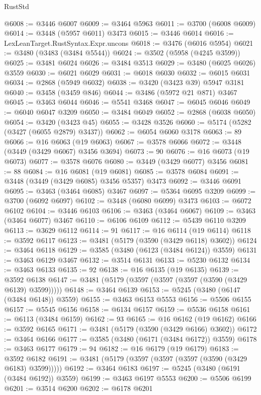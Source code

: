\begin{lexlean}{RustStd}
\begin{coremodule}
{{{{{{{{{{{{{{{{{{{@6008 := @3446 @6007
@6009 := @3464 @5963
@6011 := @3700 (@6008 @6009)
@6014 := @3448 (@5957 @6011) @3473
@6015 := @3446 @6014
@6016 := LexLeanTarget.RustSyntax.Expr.uncons
@6018 := @3476 (@6016 @5954)
@6021 := @3480 (@3483 (@3484 @5544))
@6024 := @3502 (@5958 (@4245 @3599))
@6025 := @3481 @6024
@6026 := @3484 @3513
@6029 := @3480 (@6025 @6026) @3559
@6030 := @6021 @6029
@6031 := @6018 @6030
@6032 := @6015 @6031
@6034 := @2868 (@5949 @6032)
@6038 := @3420 (@3423 @39) @5947 @3181
@6040 := @3458 (@3459 @846)
@6044 := @3486 (@5972 @21 @871) @3467
@6045 := @3463 @6044
@6046 := @5541 @3468
@6047 := @6045 @6046
@6049 := @6040 @6047 @3209
@6050 := @3484 @6049
@6052 := @2868 (@6038 @6050)
@6054 := @3420 (@3423 @45)
@6055 := @3428 @3526
@6060 := @5174 (@5282 (@3427 (@6055 @2879) @3437))
@6062 := @6054 @6060 @3178
@6063 := 89
@6066 := @16 @6063 (@19 @6063)
@6067 := @3578 @6066
@6072 := @3448 (@3449 (@3429 @6067) @3456 @3694)
@6073 := 90
@6076 := @16 @6073 (@19 @6073)
@6077 := @3578 @6076
@6080 := @3449 (@3429 @6077) @3456
@6081 := 88
@6084 := @16 @6081 (@19 @6081)
@6085 := @3578 @6084
@6091 := @3448 (@3449 (@3429 @6085) @3456 @5357) @3473
@6092 := @3446 @6091
@6095 := @3463 (@3464 @6085) @3467
@6097 := @5364 @6095 @3209
@6099 := @3700 (@6092 @6097)
@6102 := @3448 (@6080 @6099) @3473
@6103 := @6072 @6102
@6104 := @3446 @6103
@6106 := @3463 (@3464 @6067)
@6109 := @3463 (@3464 @6077) @3467
@6110 := @6106 @6109
@6112 := @5439 @6110 @3209
@6113 := @3629 @6112
@6114 := 91
@6117 := @16 @6114 (@19 @6114)
@6118 := @3592 @6117
@6123 := @3481 (@5179 (@3590 (@3429 @6118) @3602))
@6124 := @3464 @6118
@6129 := @3585 (@3480 (@6123 (@3484 @6124)) @3559)
@6131 := @3463 @6129 @3467
@6132 := @3514 @6131
@6133 := @5230 @6132
@6134 := @3463 @6133
@6135 := 92
@6138 := @16 @6135 (@19 @6135)
@6139 := @3592 @6138
@6147 := @3481 (@5179 (@3597 (@3597 (@3597 (@3590 (@3429 @6139) @3599)))))
@6148 := @3464 @6139
@6153 := @5245 (@3480 (@6147 (@3484 @6148)) @3559)
@6155 := @3463 @6153 @5553
@6156 := @5506 @6155
@6157 := @5545 @6156
@6158 := @6134 @6157
@6159 := @5536 @6158
@6161 := @6113 (@3484 @6159)
@6162 := 93
@6165 := @16 @6162 (@19 @6162)
@6166 := @3592 @6165
@6171 := @3481 (@5179 (@3590 (@3429 @6166) @3602))
@6172 := @3464 @6166
@6177 := @3585 (@3480 (@6171 (@3484 @6172)) @3559)
@6178 := @3463 @6177
@6179 := 94
@6182 := @16 @6179 (@19 @6179)
@6183 := @3592 @6182
@6191 := @3481 (@5179 (@3597 (@3597 (@3597 (@3590 (@3429 @6183) @3599)))))
@6192 := @3464 @6183
@6197 := @5245 (@3480 (@6191 (@3484 @6192)) @3559)
@6199 := @3463 @6197 @5553
@6200 := @5506 @6199
@6201 := @3514 @6200
@6202 := @6178 @6201
}}}}}}}}}}}}}}}}}}}
\end{coremodule}
\end{lexlean}
